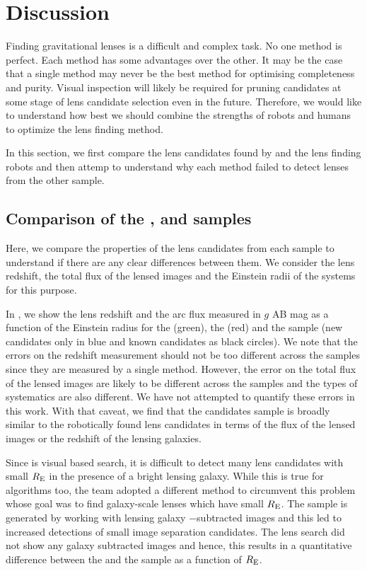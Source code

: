 \documentclass[useAMS,usenatbib,a4paper]{mn2e}
\begin{document}
\section{Discussion}
\label{sec:discuss}

Finding gravitational lenses is a difficult and complex task. No one
method is perfect. Each method has some advantages over the other. It
may be the case that a single method may never be the best method for
optimising completeness and purity. Visual inspection will likely be
required for pruning candidates at some stage of lens candidate
selection even in the future. Therefore, we would like to understand how
best we should combine the strengths of robots and humans to optimize
the lens finding method.

In this section, we first compare the lens candidates found by
\sw and the lens finding robots and then attemp to understand why each
method failed to detect lenses from the other sample.

\subsection{Comparison of the \rf, \sw and \af samples}
Here, we compare the properties of the lens candidates from each sample
to understand if there are any clear differences between them. We
consider the lens redshift, the total flux of the lensed images and the
Einstein radii of the systems for this purpose.

In , we show the lens redshift and the arc flux
measured in $g$ AB mag as a function of the Einstein radius for the \rf
(green), the \af (red) and the \sw sample (new candidates only in blue
and known candidates as black circles). We note that the errors on the
redshift measurement should not be too different across the samples
since they are measured by a single method. However, the error on the
total flux of the lensed images are likely to be different across the
samples and the types of systematics are also different.  We have not
attempted to quantify these errors in this work. With that caveat, we
find that the \sw candidates sample is broadly similar to the
robotically found lens candidates in terms of the flux of the lensed
images or the redshift of the lensing galaxies.

Since \sw is visual based search, it is difficult to detect many lens
candidates with small $R_{\rm E}$ in the presence of a bright lensing
galaxy. While this is true for algorithms too, the \rf team adopted a
different method to circumvent this problem whose goal was to find
galaxy-scale lenses which have small $R_{\rm E}$. The \rf sample is
generated by working with lensing galaxy $-$subtracted images and this
led to increased detections of small image separation candidates. The
\sw lens search did not show any galaxy subtracted images and hence,
this results in a quantitative difference between the \sw and the \rf
sample as a function of $R_{\rm E}$.
\end{document}
